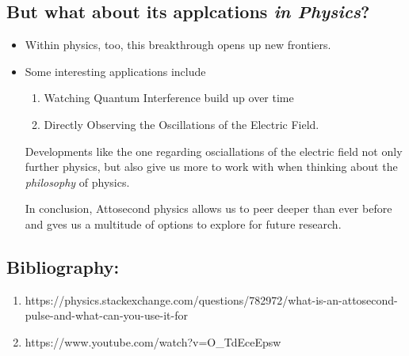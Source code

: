 \documentclass[twoside]{article}
\begin{document}
\subsection*{But what about its applcations \emph{in Physics}?}
\begin{itemize}
   \item Within physics, too, this breakthrough opens up new frontiers. 
   \item Some interesting applications include 
   \begin{enumerate}
      \item Watching Quantum Interference build up over time
      \item Directly Observing the Oscillations of the Electric Field.
   \end{enumerate}
   Developments like the one regarding osciallations of the electric field not only further physics, but also give us more to work with when thinking about the \emph{philosophy} of physics.

   In conclusion, Attosecond physics allows us to peer deeper than ever before and gves us a multitude of options to explore for future research.
\end{itemize}

\subsection*{Bibliography:}
\begin{enumerate}
   \item https://physics.stackexchange.com/questions/782972/what-is-an-attosecond-pulse-and-what-can-you-use-it-for
   \item https://www.youtube.com/watch?v=O_TdEceEpsw
\end{enumerate}
\end{document}
